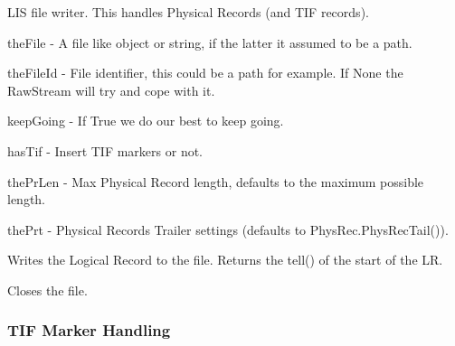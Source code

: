 \documentclass[letterpaper,10pt,english]{sphinxmanual}
\begin{document}

\begin{fulllineitems}
\label{\detokenize{ref/LIS/core/File:TotalDepth.LIS.core.File.FileWrite}}
LIS file writer. This handles Physical Records (and TIF records).

theFile - A file like object or string, if the latter it assumed to be a path.

theFileId - File identifier, this could be a path for example. If None the RawStream will try and cope with it.

keepGoing - If True we do our best to keep going.

hasTif - Insert TIF markers or not.

thePrLen - Max Physical Record length, defaults to the maximum possible length.

thePrt - Physical Records Trailer settings (defaults to PhysRec.PhysRecTail()).

\begin{fulllineitems}
\label{\detokenize{ref/LIS/core/File:TotalDepth.LIS.core.File.FileWrite.write}}
Writes the Logical Record to the file. Returns the tell() of the
start of the LR.

\end{fulllineitems}


\begin{fulllineitems}
\label{\detokenize{ref/LIS/core/File:TotalDepth.LIS.core.File.FileWrite.close}}
Closes the file.

\end{fulllineitems}


\end{fulllineitems}



\subsubsection{TIF Marker Handling}
\label{\detokenize{ref/LIS/core/TifMarker:tif-marker-handling}}\label{\detokenize{ref/LIS/core/TifMarker::doc}}\label{\detokenize{ref/LIS/core/TifMarker:module-TotalDepth.LIS.core.TifMarker}}
\end{document}
